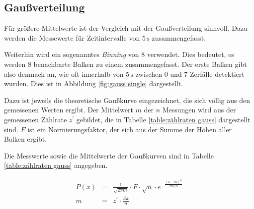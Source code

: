 \documentclass[12pt,a4paper]{scrartcl}
\numberwithin{equation}{section} %
\begin{document}
\newpage
\hypertarget{gauuxdfverteilung}{%
\subsection{Gaußverteilung}\label{gauuxdfverteilung}}
Für größere Mittelwerte ist der Vergleich mit der Gaußverteilung sinnvoll. Dazu werden die Messewerte für Zeitintervalle von $5 \mathrm{\,s}$ zusammengefasst.

Weiterhin wird ein sogenanntes \textit{Binning} von $8$ verwendet. Dies bedeutet, es werden $8$ benachbarte Balken zu einem zusammengefasst. Der erste Balken gibt also demnach an, wie oft innerhalb von $5 \mathrm{\, s}$ zwischen $0$ und $7$ Zerfälle detektiert wurden. Dies ist in Abbildung \ref{fig:gauss single} dargestellt.

Dazu ist jeweils die theoretische Gaußkurve eingezeichnet, die sich völlig aus den gemessenen Werten ergibt. Der Mittelwert $m$ der $n$ Messungen wird aus der gemessenen Zählrate $z^\prime$ gebildet, die in Tabelle \ref{table:zählraten gauss} dargestellt sind. $F$ ist ein Normierungsfaktor, der sich aus der Summe der Höhen aller Balken ergibt.

Die Messwerte sowie die Mittelwerte der Gaußkurven sind in Tabelle \ref{table:zählraten gauss} angegeben.

\begin{eqnarray}
	P(x) &=& \frac{1}{\sqrt{2 \pi m}} \cdot F \cdot \sqrt{n} \cdot e^{- \frac{(x-m)^2}{2m/n}} \\
	m &=& z^\prime \cdot \frac{\Delta t}{n}
\end{eqnarray}
\end{document}
